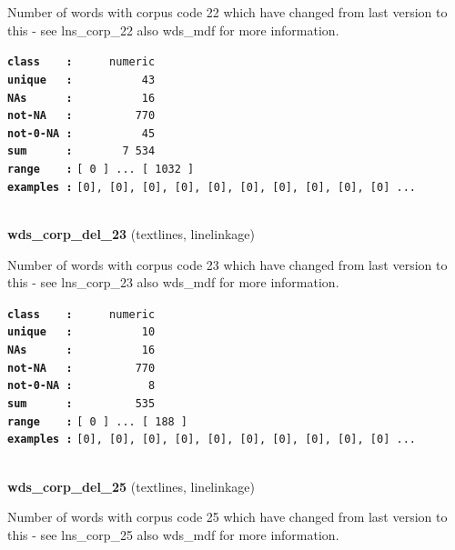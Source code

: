 \documentclass[]{article}
\begin{document}
Number of words with corpus code 22 which have changed from last version
to this - see lns\_corp\_22 also wds\_mdf for more information.

\textbf{\texttt{class\ \ \ \ :}} \texttt{~~~~~numeric}\\
\textbf{\texttt{unique\ \ \ :}} \texttt{~~~~~~~~~~43}\\
\textbf{\texttt{NAs\ \ \ \ \ \ :}} \texttt{~~~~~~~~~~16}\\
\textbf{\texttt{not-NA\ \ \ :}} \texttt{~~~~~~~~~770}\\
\textbf{\texttt{not-0-NA\ :}} \texttt{~~~~~~~~~~45}\\
\textbf{\texttt{sum\ \ \ \ \ \ :}} \texttt{~~~~~~~7~534}\\
\textbf{\texttt{range\ \ \ \ :}}
\texttt{{[}\ 0\ {]}\ ...\ {[}\ 1032\ {]}}\\
\textbf{\texttt{examples\ :}}
\texttt{{[}0{]},\ {[}0{]},\ {[}0{]},\ {[}0{]},\ {[}0{]},\ {[}0{]},\ {[}0{]},\ {[}0{]},\ {[}0{]},\ {[}0{]}\ ...}\\

~

\textbf{wds\_corp\_del\_23} (textlines, linelinkage)

Number of words with corpus code 23 which have changed from last version
to this - see lns\_corp\_23 also wds\_mdf for more information.

\textbf{\texttt{class\ \ \ \ :}} \texttt{~~~~~numeric}\\
\textbf{\texttt{unique\ \ \ :}} \texttt{~~~~~~~~~~10}\\
\textbf{\texttt{NAs\ \ \ \ \ \ :}} \texttt{~~~~~~~~~~16}\\
\textbf{\texttt{not-NA\ \ \ :}} \texttt{~~~~~~~~~770}\\
\textbf{\texttt{not-0-NA\ :}} \texttt{~~~~~~~~~~~8}\\
\textbf{\texttt{sum\ \ \ \ \ \ :}} \texttt{~~~~~~~~~535}\\
\textbf{\texttt{range\ \ \ \ :}}
\texttt{{[}\ 0\ {]}\ ...\ {[}\ 188\ {]}}\\
\textbf{\texttt{examples\ :}}
\texttt{{[}0{]},\ {[}0{]},\ {[}0{]},\ {[}0{]},\ {[}0{]},\ {[}0{]},\ {[}0{]},\ {[}0{]},\ {[}0{]},\ {[}0{]}\ ...}\\

~

\textbf{wds\_corp\_del\_25} (textlines, linelinkage)

Number of words with corpus code 25 which have changed from last version
to this - see lns\_corp\_25 also wds\_mdf for more information.
\end{document}
